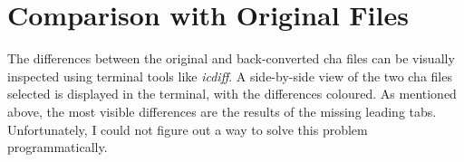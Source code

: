 \section{Comparison with Original Files}
The differences between the original and back-converted cha files can be visually inspected using terminal tools like \emph{icdiff}. A side-by-side view of the two cha files selected is displayed in the terminal, with the differences coloured. As mentioned above, the most visible differences are the results of the missing leading tabs. Unfortunately, I could not figure out a way to solve this problem programmatically.
